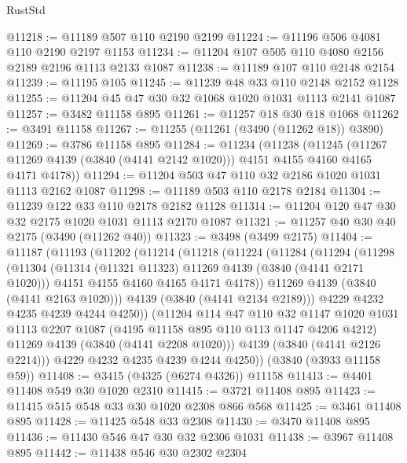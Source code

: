 \begin{lexlean}{RustStd}
\begin{coremodule}
{\begin{coremodule}
{{{{{{{{{{{{{{{{{{{{{{{{{{@11218 := @11189 @507 @110 @2190 @2199
@11224 := @11196 @506 @4081 @110 @2190 @2197 @1153
@11234 := @11204 @107 @505 @110 @4080 @2156 @2189 @2196 @1113 @2133 @1087
@11238 := @11189 @107 @110 @2148 @2154
@11239 := @11195 @105
@11245 := @11239 @48 @33 @110 @2148 @2152 @1128
@11255 := @11204 @45 @47 @30 @32 @1068 @1020 @1031 @1113 @2141 @1087
@11257 := @3482 @11158 @895
@11261 := @11257 @18 @30 @18 @1068
@11262 := @3491 @11158
@11267 := @11255 (@11261 (@3490 (@11262 @18)) @3890)
@11269 := @3786 @11158 @895
@11284 := @11234
    (@11238
      (@11245
        (@11267 @11269 @4139 (@3840 (@4141 @2142 @1020)))
        @4151
        @4155
        @4160
        @4165
        @4171
        @4178))
@11294 := @11204 @503 @47 @110 @32 @2186 @1020 @1031 @1113 @2162 @1087
@11298 := @11189 @503 @110 @2178 @2184
@11304 := @11239 @122 @33 @110 @2178 @2182 @1128
@11314 := @11204 @120 @47 @30 @32 @2175 @1020 @1031 @1113 @2170 @1087
@11321 := @11257 @40 @30 @40 @2175 (@3490 (@11262 @40))
@11323 := @3498 (@3499 @2175)
@11404 := @11187
    (@11193
      (@11202
        (@11214
          (@11218
            (@11224
              (@11284
                (@11294
                  (@11298
                    (@11304
                      (@11314 (@11321 @11323) @11269 @4139 (@3840 (@4141 @2171 @1020)))
                      @4151
                      @4155
                      @4160
                      @4165
                      @4171
                      @4178))
                  @11269
                  @4139
                  (@3840 (@4141 @2163 @1020)))
                @4139
                (@3840 (@4141 @2134 @2189)))
              @4229
              @4232
              @4235
              @4239
              @4244
              @4250))
          (@11204
            @114
            @47
            @110
            @32
            @1147
            @1020
            @1031
            @1113
            @2207
            @1087
            (@4195 @11158 @895 @110 @113 @1147 @4206 @4212)
            @11269
            @4139
            (@3840 (@4141 @2208 @1020)))
          @4139
          (@3840 (@4141 @2126 @2214)))
        @4229
        @4232
        @4235
        @4239
        @4244
        @4250))
    (@3840 (@3933 @11158 @59))
@11408 := @3415 (@4325 (@6274 @4326)) @11158
@11413 := @4401 @11408 @549 @30 @1020 @2310
@11415 := @3721 @11408 @895
@11423 := @11415 @515 @548 @33 @30 @1020 @2308 @866 @568
@11425 := @3461 @11408 @895
@11428 := @11425 @548 @33 @2308
@11430 := @3470 @11408 @895
@11436 := @11430 @546 @47 @30 @32 @2306 @1031
@11438 := @3967 @11408 @895
@11442 := @11438 @546 @30 @2302 @2304
}}}}}}}}}}}}}}}}}}}}}}}}}}
\end{coremodule}}
\end{coremodule}
\end{lexlean}
